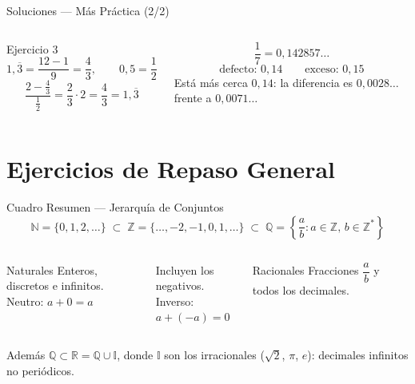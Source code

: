 \documentclass[aspectratio=169]{beamer}
\begin{document}
\begin{frame}{Soluciones — Más Práctica \textnormal{(2/2)}}
  \mwtopanchoroff
  \begin{columns}[T]
    \begin{exampleblock}{Ejercicio 3}
      \[
        1{,}\overline{3} = \frac{12 - 1}{9} = \frac{4}{3},
        \qquad
        0{,}5 = \frac{1}{2}
      \]
      \[
        \frac{2 - \frac{4}{3}}{\frac{1}{2}}
        = \frac{2}{3} \cdot 2 = \frac{4}{3} = 1{,}\overline{3}
      \]
    \end{exampleblock}
    \begin{mwextra}[Ejercicio 4]
      \[
        \frac{1}{7} = 0{,}142857\dots
      \]
      \[
        \text{defecto: } 0{,}14 \qquad
        \text{exceso: } 0{,}15
      \]
      \small Está más cerca $0{,}14$: la diferencia es $0{,}0028\dots$
      frente a $0{,}0071\dots$
    \end{mwextra}
  \end{columns}
  \mwtopanchoron
\end{frame}

\section{Ejercicios de Repaso General}

\begin{frame}{Cuadro Resumen — Jerarquía de Conjuntos}
  \[
    \mathbb{N} = \{0, 1, 2, \dots\}
    \;\subset\;
    \mathbb{Z} = \{\dots, -2, -1, 0, 1, \dots\}
    \;\subset\;
    \mathbb{Q} = \left\{\frac{a}{b} : a \in \mathbb{Z},\,
    b \in \mathbb{Z}^{*}\right\}
  \]
  \vspace{4pt}
  \begin{columns}[T]
    \begin{block}{Naturales}
      Enteros, discretos e infinitos.\\
      Neutro: $a + 0 = a$
    \end{block}
    \begin{mwextra}[Enteros]
      Incluyen los negativos.\\
      Inverso: $a + (-a) = 0$
    \end{mwextra}
    \begin{exampleblock}{Racionales}
      Fracciones $\dfrac{a}{b}$ y todos los decimales.
    \end{exampleblock}
  \end{columns}
  \vspace{2pt}
  \begin{center}\small
    Además $\mathbb{Q} \subset \mathbb{R} = \mathbb{Q} \cup \mathbb{I}$,
    donde $\mathbb{I}$ son los irracionales
    ($\sqrt{2}$, $\pi$, $e$): decimales infinitos no periódicos.
  \end{center}
\end{frame}
\end{document}
